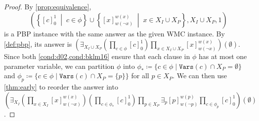 \begin{proof}
  By \cref{prop:equivalence},
  \begin{equation}
    \left(\left\{{[c]}_{0}^{1} \;\middle|\; c \in \phi\right\} \cup \left\{{[x]}_{w(\neg
          x)}^{w(x)} \;\middle|\; x \in X_I \cup X_P\right\}, X_I \cup X_P,
      1\right) \label{eq:new_wmc2}
  \end{equation}
  is a PBP instance with the same answer as the given WMC instance. By
  \cref{def:pbp}, its answer is
  $\left(\exists_{X_I \cup X_P} \left(\prod_{c \in \phi} {[c]}_0^1 \right) \prod_{x \in X_I \cup X_P} {[x]}_{w(\neg x)}^{w(x)} \right)(\emptyset)$.
  Since both \cref{cond:d02,cond:bklm16} ensure that each clause in $\phi$ has
  at most one parameter variable, we can partition $\phi$ into
  $\phi_* \coloneqq \{c \in \phi \mid \mathtt{Vars}(c) \cap X_P = \emptyset \}$
  and
  $\phi_p \coloneqq \{ c \in \phi \mid \mathtt{Vars}(c) \cap X_P = \{ p \} \}$
  for all $p \in X_P$. We can then use \cref{thm:early} to reorder the answer
  into
  $\left(\exists_{X_I} \left( \prod_{x \in X_I} {[x]}_{w(\neg x)}^{w(x)} \right) \left( \prod_{c \in \phi_*} {[c]}_0^1 \right) \prod_{p \in X_P} \exists_p {[p]}_{w(\neg p)}^{w(p)} \prod_{c \in \phi_p} {[c]}_0^1 \right)(\emptyset)$.


\end{proof}
